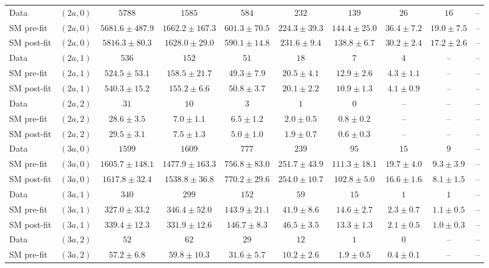 \begin{table*}[h!]
{\begin{tabular}{lccccccccc}
 Data & $(2a,0)$ & $5788$ & $1585$ & $584$ & $232$ & $139$ & $26$ & $16$ & -- \\[0.5ex]
 SM pre-fit & $(2a,0)$ & $5681.6\pm487.9$ & $1662.2\pm167.3$ & $601.3\pm70.5$ & $224.3\pm39.3$ & $144.4\pm25.0$ & $36.4\pm7.2$ & $19.0\pm7.5$ & -- \\[0.5ex]
 SM post-fit & $(2a,0)$ & $5816.3\pm80.3$ & $1628.0\pm29.0$ & $590.1\pm14.8$ & $231.6\pm9.4$ & $138.8\pm6.7$ & $30.2\pm2.4$ & $17.2\pm2.6$ & -- \\[0.5ex]
 Data & $(2a,1)$ & $536$ & $152$ & $51$ & $18$ & $7$ & $4$ & -- & -- \\[0.5ex]
 SM pre-fit & $(2a,1)$ & $524.5\pm53.1$ & $158.5\pm21.7$ & $49.3\pm7.9$ & $20.5\pm4.1$ & $12.9\pm2.6$ & $4.3\pm1.1$ & -- & -- \\[0.5ex]
 SM post-fit & $(2a,1)$ & $540.3\pm15.2$ & $155.2\pm6.6$ & $50.8\pm3.7$ & $20.1\pm2.2$ & $10.9\pm1.3$ & $4.1\pm0.9$ & -- & -- \\[0.5ex]
 Data & $(2a,2)$ & $31$ & $10$ & $3$ & $1$ & $0$ & -- & -- & -- \\[0.5ex]
 SM pre-fit & $(2a,2)$ & $28.6\pm3.5$ & $7.0\pm1.1$ & $6.5\pm1.2$ & $2.0\pm0.5$ & $0.8\pm0.2$ & -- & -- & -- \\[0.5ex]
 SM post-fit & $(2a,2)$ & $29.5\pm3.1$ & $7.5\pm1.3$ & $5.0\pm1.0$ & $1.9\pm0.7$ & $0.6\pm0.3$ & -- & -- & -- \\[0.5ex]
 Data & $(3a,0)$ & $1599$ & $1609$ & $777$ & $239$ & $95$ & $15$ & $9$ & -- \\[0.5ex]
 SM pre-fit & $(3a,0)$ & $1605.7\pm148.1$ & $1477.9\pm163.3$ & $756.8\pm83.0$ & $251.7\pm43.9$ & $111.3\pm18.1$ & $19.7\pm4.0$ & $9.3\pm3.9$ & -- \\[0.5ex]
 SM post-fit & $(3a,0)$ & $1617.8\pm32.4$ & $1538.8\pm36.8$ & $770.2\pm29.6$ & $254.0\pm10.7$ & $102.8\pm5.0$ & $16.6\pm1.6$ & $8.1\pm1.5$ & -- \\[0.5ex]
 Data & $(3a,1)$ & $340$ & $299$ & $152$ & $59$ & $15$ & $1$ & $1$ & -- \\[0.5ex]
 SM pre-fit & $(3a,1)$ & $327.0\pm33.2$ & $346.4\pm52.0$ & $143.9\pm21.1$ & $41.9\pm8.6$ & $14.6\pm2.7$ & $2.3\pm0.7$ & $1.1\pm0.5$ & -- \\[0.5ex]
 SM post-fit & $(3a,1)$ & $339.4\pm12.3$ & $331.9\pm12.6$ & $146.7\pm8.3$ & $46.5\pm3.5$ & $13.3\pm1.3$ & $2.1\pm0.5$ & $1.0\pm0.3$ & -- \\[0.5ex]
 Data & $(3a,2)$ & $52$ & $62$ & $29$ & $12$ & $1$ & $0$ & -- & -- \\[0.5ex]
 SM pre-fit & $(3a,2)$ & $57.2\pm6.8$ & $59.8\pm10.3$ & $31.6\pm5.7$ & $10.2\pm2.6$ & $1.9\pm0.5$ & $0.4\pm0.1$ & -- & -- \\[0.5ex]

\end{tabular}}
\end{table*}
